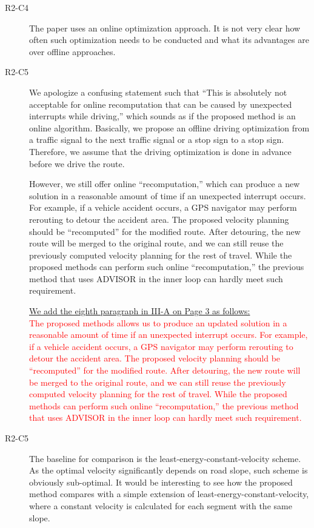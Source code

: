 \documentclass[onecolumn]{IEEEconf}
\begin{document}
\begin{description}

\item [R2-C4] The paper uses an online optimization approach. It is not very clear how often such optimization needs to be conducted and what its advantages are over offline approaches.

\item [R2-C5] We apologize a confusing statement such that ``This is absolutely not acceptable for online recomputation that can be caused by unexpected interrupts while driving,'' which sounds as if the proposed method is an online algorithm. Basically, we propose an offline driving optimization from a traffic signal to the next traffic signal or  a stop sign to a stop sign. Therefore, we assume that the driving optimization is done in advance before we drive the route.

However, we still offer online ``recomputation,'' which can produce a new solution in a reasonable amount of time if an unexpected interrupt occurs. For example, if a vehicle accident occurs, a GPS navigator may perform rerouting to detour the accident area. The proposed velocity planning should be ``recomputed'' for the modified route. After detouring, the new route will be merged to the original route, and we can still reuse the previously computed  velocity planning for the rest of travel. While the proposed methods can perform such online ``recomputation,'' the previous method that uses ADVISOR in the inner loop can hardly meet such requirement. 

\uline{We add the eighth paragraph in III-A on Page 3 as follows:}\\
\textcolor{red}{The proposed methods allows us to produce an updated solution in a reasonable amount of time if an unexpected interrupt occurs. For example, if a vehicle accident occurs, a GPS navigator may perform rerouting to detour the accident area. The proposed velocity planning should be ``recomputed'' for the modified route. After detouring, the new route will be merged to the original route, and we can still reuse the previously computed  velocity planning for the rest of travel. While the proposed methods can perform such online ``recomputation,'' the previous method that uses ADVISOR in the inner loop can hardly meet such requirement.}

\item [R2-C5] The baseline for comparison is the least-energy-constant-velocity scheme. As the optimal velocity significantly depends on road slope, such scheme is obviously sub-optimal. It would be interesting to see how the proposed method compares with a simple extension of least-energy-constant-velocity, where a constant velocity is calculated for each segment with the same slope.


\end{description}
\end{document}
